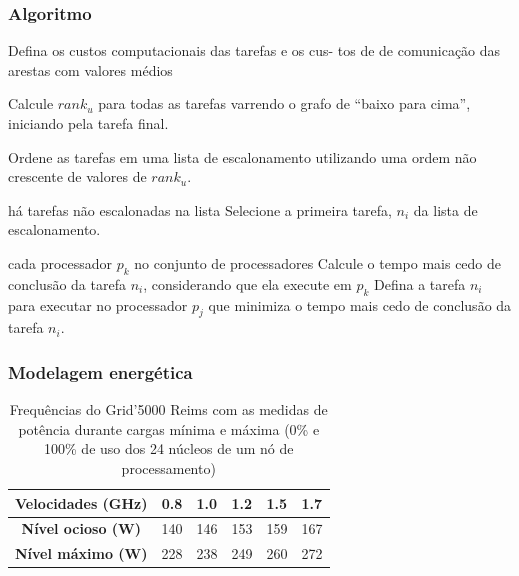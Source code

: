 \documentclass{beamer}
\begin{document}
\begin{frame}
\frametitle{Algoritmo}
	\begin{codebox}
	\li	Defina os custos computacionais das tarefas e os cus-
	\zi tos de de comunicação das arestas com valores médios

	\li	Calcule $rank_u$ para todas as tarefas varrendo o grafo
	\zi de ``baixo para cima'',	iniciando pela tarefa final.

	\li Ordene as tarefas em uma lista de escalonamento utilizando
	\zi uma ordem não crescente de valores de $rank_u$.

	\li 	\While há tarefas não escalonadas na lista
	\li 		\Do
					Selecione a primeira tarefa, $n_i$ da lista de escalonamento.

	\li				\For cada processador $p_k$ no conjunto de processadores
	\li 				\Do
							Calcule o tempo mais cedo de conclusão da tarefa  $n_i$,
	\zi						considerando que ela execute em $p_k$
						\End
	\li				Defina a tarefa $n_i$ para executar no processador $p_j$ que
	\zi					minimiza o tempo mais cedo de conclusão da tarefa $n_i$.
				\End
	\End
	\end{codebox}
\end{frame}

\begin{frame}
\frametitle{Modelagem energética}

\begin{table}
    \begin{tabular}{c|cllll}
    \hline
    \textbf{Velocidades (GHz)} & \textbf{0.8} & \textbf{1.0} & \textbf{1.2} & \textbf{1.5} & \textbf{1.7} \\ \hline
    \textbf{Nível ocioso (W)}       & 140          & 146          & 153          & 159          & 167          \\
    \textbf{Nível máximo (W)}  & 228          & 238          & 249          & 260          & 272          \\ \hline
    \end{tabular}
    \caption{Frequências do Grid'5000 Reims com as medidas de potência durante
    cargas mínima e máxima (0\% e 100\% de uso dos 24 núcleos de um nó de processamento)
    \cite{guerout:energy_aware_simulation}}
\end{table}

\end{frame}
\end{document}
